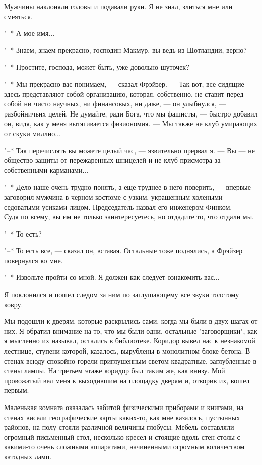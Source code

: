 Мужчины наклоняли головы и подавали руки. Я не знал,  злиться  мне  или
смеяться.

"--* А мое имя...

"--* Знаем, знаем прекрасно, господин Макмур, вы ведь из Шотландии, верно?

"--* Простите, господа, может быть, уже довольно шуточек?

"--* Мы прекрасно вас понимаем, --- сказал Фрэйзер. --- Так вот,  все  сидящие
здесь представляют собой организацию, которая, собственно, не ставит перед
собой ни чисто  научных,  ни  финансовых,  ни  даже,  ---  он  улыбнулся,  ---
разбойничьих целей. Не думайте,  ради  Бога,  что  мы  фашисты,  ---  быстро
добавил он, видя, как у меня вытягивается физиономия. --- Мы также  не  клуб
умирающих от скуки миллио...

"--* Так перечислять вы можете целый час, --- язвительно прервал я. ---  Вы  ---
не общество защиты  от  пережаренных  шницелей  и  не  клуб  присмотра  за
собственными карманами...

"--* Дело наше очень трудно понять, а  еще  труднее  в  него  поверить,  ---
впервые заговорил мужчина в черном костюме с  узким,  украшенным  холеными
седоватыми усиками лицом. Председатель назвал его инженером Финком. --- Судя
по всему, вы им не только заинтересуетесь, но отдадите то, что отдали мы.

"--* То есть?

"--* То есть все, ---  сказал  он,  вставая.  Остальные  тоже  поднялись,  а
Фрэйзер повернулся ко мне.

"--* Извольте пройти со мной. Я должен как следует ознакомить вас...

Я поклонился и пошел следом за ним по заглушающему все  звуки  толстому
ковру.

Мы подошли к дверям, которые раскрылись сами,  когда  мы  были  в  двух
шагах от них. Я обратил внимание  на  то,  что  мы  были  одни,  остальные
"заговорщики", как я мысленно их называл, остались в  библиотеке.  Коридор
вывел нас к незнакомой лестнице, ступени которой,  казалось,  вырублены  в
монолитном блоке бетона.  В  стенах  всюду  спокойно  горели  приглушенным
светом квадратные, заглубленные в стены лампы. На  третьем  этаже  коридор
был таким же, как внизу. Мой провожатый вел меня к выходившим на  площадку
дверям и, отворив их, вошел первым.

Маленькая комната оказалась забитой физическими приборами и книгами, на
стенах висели географические карты каких-то, как мне  казалось,  пустынных
районов, на полу стояли  различной  величины  глобусы.  Мебель  составляли
огромный письменный стол, несколько кресел и стоящие вдоль  стен  столы  с
какими-то очень  сложными  аппаратами,  начиненными  огромным  количеством
катодных ламп.

